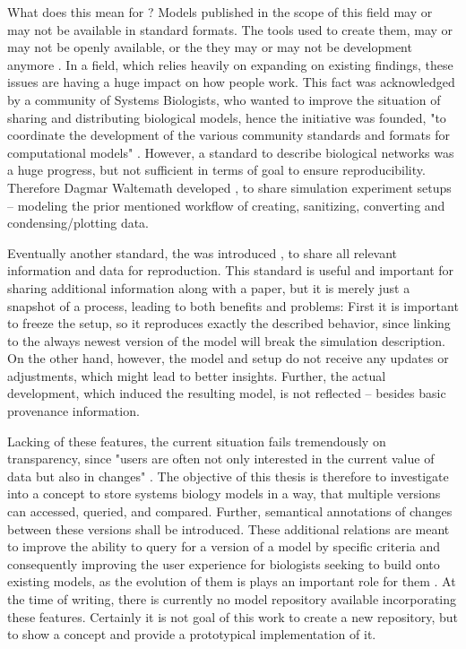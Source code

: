 What does this mean for \sysbio? Models published in the scope of this field may or may not be available in standard formats. The tools used to create them, may or may not be openly available, or the they may or may not be development anymore \citep{Peng2011}.
In a field, which relies heavily on expanding on existing findings, these issues are having a huge impact on how people work.
This fact was acknowledged by a community of Systems Biologists, who wanted to improve the situation of sharing and distributing biological models, hence the \combine initiative was founded, "to coordinate the development of the various community standards and formats for computational models" \citep{COMBINE}.
However, a standard to describe biological networks was a huge progress, but not sufficient in terms of goal to ensure reproducibility. Therefore Dagmar Waltemath developed \sedml \citep{Waltemath2011a}, to share simulation experiment setups -- modeling the prior mentioned workflow of creating, sanitizing, converting and condensing/plotting data.

Eventually another standard, the \ca was introduced \citep{Bergmann2014a}, to share all relevant information and data for reproduction. This standard is useful and important for sharing additional information along with a paper, but it is merely just a snapshot of a process, leading to both benefits and problems: First it is important to freeze the setup, so it reproduces exactly the described behavior, since linking to the always newest version of the model will break the simulation description. On the other hand, however, the model and setup do not receive any updates or adjustments, which might lead to better insights. Further, the actual development, which induced the resulting model, is not reflected -- besides basic provenance information.

Lacking of these features, the current situation fails tremendously on transparency, since "users are often not only interested in the current value of data but also in changes" \citep{Cobena2002}.
The objective of this thesis is therefore to investigate into a concept to store systems biology models in a way, that multiple versions can accessed, queried, and compared. Further, semantical annotations of changes between these versions shall be introduced. These additional relations are meant to improve the ability to query for a version of a model by specific criteria and consequently improving the user experience for biologists seeking to build onto existing models, as the evolution of them is plays an important role for them \citep{Scharm2015}.
At the time of writing, there is currently no model repository available incorporating these features. Certainly it is not goal of this work to create a new repository, but to show a concept and provide a prototypical implementation of it.

